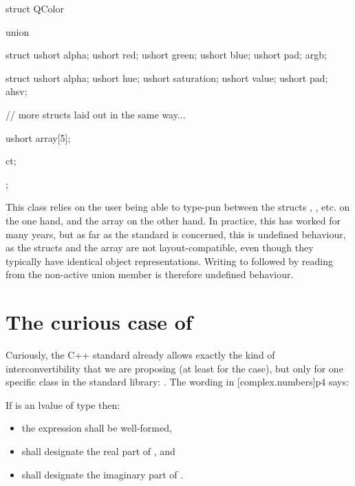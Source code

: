 \begin{codeblock}
struct QColor {
    union {
        struct {
            ushort alpha;
            ushort red;
            ushort green;
            ushort blue;
            ushort pad;
        } argb;

        struct {
            ushort alpha;
            ushort hue;
            ushort saturation;
            ushort value;
            ushort pad;
        } ahsv;
        
        // more structs laid out in the same way...

        ushort array[5];
    } ct;
};
\end{codeblock}

This class relies on the user being able to type-pun between the structs , , etc. on the one hand, and the  array on the other hand. In practice, this has worked for many years, but as far as the standard is concerned, this is undefined behaviour, as the structs and the array are not layout-compatible, even though they typically have identical object representations. Writing to  followed by reading from the non-active union member  is therefore undefined behaviour.


\section{The curious case of }

Curiously, the C++ standard already allows exactly the kind of interconvertibility that we are proposing (at least for the  case), but only for one specific class in the standard library: . The wording in [complex.numbers]p4 says:

\begin{adjustwidth}{0.9cm}{0.9cm}
If  is an lvalue of type \cv{}  then:

\begin{itemize}
\item the expression  shall be well-formed,
\item {} shall designate the real part of , and
\item {} shall designate the imaginary part of .
\end{itemize}
\end{adjustwidth}

